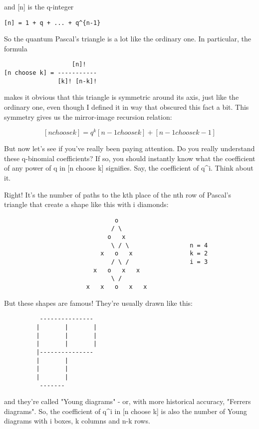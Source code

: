 and [n] is the q-integer

\begin{verbatim}
[n] = 1 + q + ... + q^{n-1}
\end{verbatim}
    
So the quantum Pascal's triangle is a lot like the ordinary one.  
In particular, the formula 

\begin{verbatim}
                   [n]!
[n choose k] = -----------
               [k]! [n-k]!
\end{verbatim}
    
makes it obvious that this triangle is symmetric around its axis, just
like the ordinary one, even though I defined it in way that obscured
this fact a bit.  This symmetry gives us the mirror-image recursion
relation:

$$
[n choose k]  =  q^{k} [n-1 choose k]  +  [n-1 choose k-1]
$$
    
But now let's see if you've really been paying attention.  Do you really
understand these q-binomial coefficients?  If so, you should instantly
know what the coefficient of any power of q in [n choose k] signifies. 
Say, the coefficient of q^{i}.  Think about it.

Right!  It's the number of paths to the kth place of the nth row
of Pascal's triangle that create a shape like this with i diamonds:

\begin{verbatim}
                               o
                              / \
                             o   x
                              \ / \                 n = 4
                           x   o   x                k = 2
                              / \ /                 i = 3
                         x   o   x   x
                              \ /
                       x   x   o   x   x
\end{verbatim}
    
But these shapes are famous!  They're usually drawn like this:


\begin{verbatim}
          ---------------
         |       |       |
         |       |       |
         |       |       |
         |---------------
         |       |       
         |       |       
         |       |       
          -------
\end{verbatim}
    

and they're called "Young diagrams" - or, with more historical
accuracy, "Ferrers diagrams".  So, the coefficient of q^i in
[n choose k] is also the number of Young diagrams with i boxes, k
columns and n-k rows.

